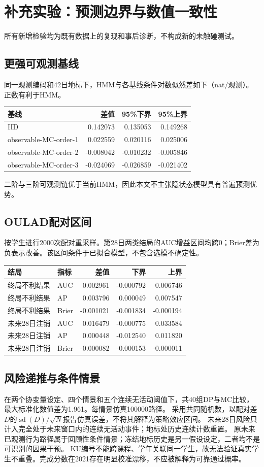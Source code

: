 \section{补充实验：预测边界与数值一致性}
所有新增检验均为既有数据上的复现和事后诊断，不构成新的未触碰测试。
\subsection{更强可观测基线}
同一观测编码和42日地标下，HMM与各基线条件对数似然差如下（nat/观测）。正数有利于HMM。
\begin{center}\begin{tabular}{lrrr}\hline 基线 & 差值 & 95\%下界 & 95\%上界\\\hline
IID & 0.142073 & 0.135053 & 0.149268 \\
observable-MC-order-1 & 0.022559 & 0.020116 & 0.025006 \\
observable-MC-order-2 & -0.008042 & -0.010232 & -0.005846 \\
observable-MC-order-3 & -0.024069 & -0.026859 & -0.021402 \\
\hline\end{tabular}\end{center}
二阶与三阶可观测链优于当前HMM，因此本文不主张隐状态模型具有普遍预测优势。
\subsection{OULAD配对区间}
按学生进行2000次配对重采样。第28日两类结局的AUC增益区间均跨0；Brier差为负表示改善。该区间条件于已拟合模型，不包含选模不确定性。
\begin{center}\begin{tabular}{llrrr}\hline 结局 & 指标 & 差值 & 下界 & 上界\\\hline
终局不利结果 & AUC & 0.002961 & -0.000792 & 0.006746 \\
终局不利结果 & AP & 0.003796 & 0.000049 & 0.007547 \\
终局不利结果 & Brier & -0.001021 & -0.001834 & -0.000194 \\
未来28日注销 & AUC & 0.016479 & -0.000775 & 0.033584 \\
未来28日注销 & AP & 0.000448 & -0.012540 & 0.011820 \\
未来28日注销 & Brier & -0.000082 & -0.000153 & -0.000011 \\
\hline\end{tabular}\end{center}
\subsection{风险递推与条件情景}
在两个协变量设定、四个情景和五个连续无活动阈值下，共40组DP与MC比较，最大标准化数值差为1.961。每情景仿真100000路径。
采用共同随机数，以配对差$D$的$\operatorname{sd}(D)/\sqrt{N}$报告仿真误差，不将其解释为策略效应区间。
未来28日风险只计入完全处于未来窗口内的连续无活动事件；地标处历史连续计数重置。
原未来已观测行为路径属于回顾性条件情景；冻结地标历史是另一假设设定，二者均不是可识别的因果干预。
KU编号不能跨课程、学年关联同一学生，故无法验证真实学生不重叠。完成分数在2021存在明显校准漂移，不应被解释为可靠通过概率。
